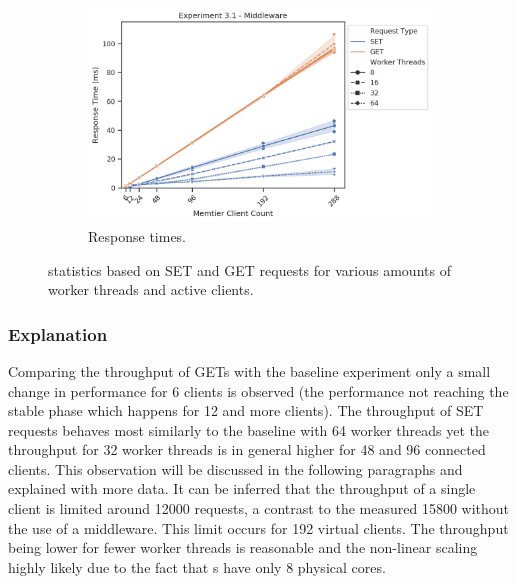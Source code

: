 \begin{figure}
{\begin{subfigure}[t!]{0.55\textwidth}
                    \includegraphics[width=1\textwidth]{../data_analysis/figures/3-1_mw_response_time.png}
                    \caption{Response times.\label{fig:single_mw_rt}}
                \end{subfigure}
            }
            \caption{\mw{} statistics based on SET and GET requests for various amounts of worker threads and active
                     clients.\label{fig:single_mw_all}}
        \end{figure}

        \subsubsection{Explanation\label{subsubsec:3_one-middleware_summary}}

            Comparing the throughput of GETs with the baseline experiment only a small change in performance for 6
            clients is observed (the performance not reaching the stable phase which happens for 12 and more clients).
            The throughput of SET requests behaves most similarly to the baseline with 64 worker threads yet the
            throughput for 32 worker threads is in general higher for 48 and 96 connected clients. This observation will
            be discussed in the following paragraphs and explained with more data. It can be inferred that the
            throughput of a single client is limited around 12000 requests, a contrast to the measured 15800 without the
            use of a middleware. This limit occurs for 192 virtual clients. The throughput being lower for fewer worker
            threads is reasonable and the non-linear scaling highly likely due to the fact that \mw{}s have only 8
            physical cores.

